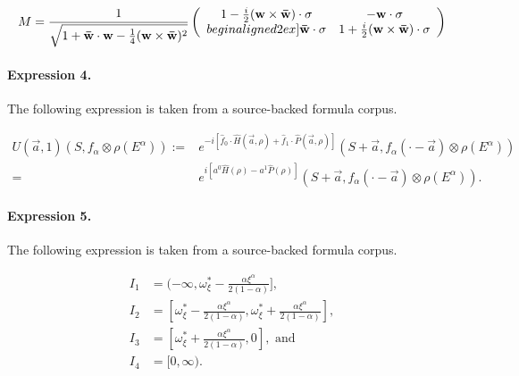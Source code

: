 \documentclass[11pt]{article}
\begin{document}
\begin{align*}M = \frac{1}{\sqrt{1+{\bf \bar{w}} \cdot {\bf w} - {1\over 4}({\bf w}\times{\bf {\bar w}})^2 }}\left(\begin{array}{cc}1- {i\over 2}({\bf w} \times {\bf \bar{w}})\cdot {\bf \sigma} & -{\bf w} \cdot {\bf \sigma}\\begin{align*}2ex]{\bf \bar{w}} \cdot {\bf \sigma} & 1+ {i\over 2}({\bf w} \times {\bf\bar{w}})\cdot {\bf \sigma}\end{array}\right)\end{align*}

\paragraph{Expression 4.} The following expression is taken from a source-backed formula corpus.

\begin{align*}U(\vec{a},1)\left(S, f_\alpha \otimes \rho(E^\alpha)\right) :=& e^{-i[\hat{f}_0\cdot\hat{H}(\vec{a}, \rho) + \hat{f}_1\cdot \hat{P}(\vec{a},\rho)]}\left(S+\vec{a}, f_\alpha(\cdot - \vec{a}) \otimes \rho(E^\alpha)\right) \\=& e^{i[a^0 \hat{H}(\rho) - a^1\hat{P}(\rho)]}\left(S+\vec{a}, f_\alpha(\cdot - \vec{a}) \otimes \rho(E^\alpha)\right).\end{align*}

\paragraph{Expression 5.} The following expression is taken from a source-backed formula corpus.

\begin{align*}I_1 & = (-\infty, \omega_{\xi}^{\ast} - \frac{\alpha \xi^{\alpha}}{2(1 - \alpha)}], \\I_2 & = [\omega_{\xi}^{\ast} - \frac{\alpha \xi^{\alpha}}{2(1 - \alpha)}, \omega_{\xi}^{\ast} + \frac{\alpha \xi^{\alpha}}{2(1 - \alpha)}],\\I_3 & = [\omega_{\xi}^{\ast} + \frac{\alpha \xi^{\alpha}}{2(1 - \alpha)}, 0], \text{ and } \\I_4 & = [0, \infty).\end{align*}
\end{document}
